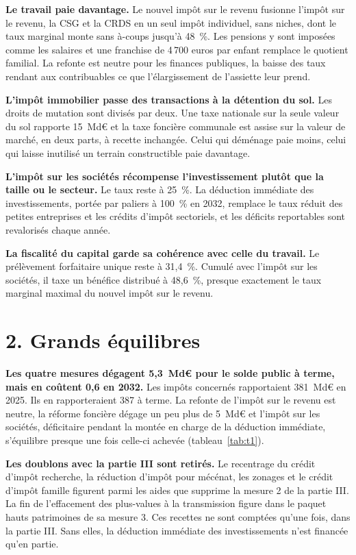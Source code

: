 \documentclass[10pt,a4paper]{article}
\begin{document}
\textbf{Le travail paie davantage.} Le nouvel impôt sur le revenu fusionne l'impôt sur le revenu, la CSG et la CRDS en un
seul impôt individuel, sans niches, dont le taux marginal monte sans à-coups jusqu'à 48~\%. Les pensions y sont imposées
comme les salaires et une franchise de 4\,700 euros par enfant remplace le quotient familial. La refonte est neutre pour
les finances publiques, la baisse des taux rendant aux contribuables ce que l'élargissement de l'assiette leur prend.

\textbf{L'impôt immobilier passe des transactions à la détention du sol.} Les droits de mutation sont divisés par deux.
Une taxe nationale sur la seule valeur du sol rapporte 15~Md€ et la taxe foncière communale est assise sur la valeur de
marché, en deux parts, à recette inchangée. Celui qui déménage paie moins, celui qui laisse inutilisé un terrain
constructible paie davantage.

\textbf{L'impôt sur les sociétés récompense l'investissement plutôt que la taille ou le secteur.} Le taux reste à 25~\%.
La déduction immédiate des investissements, portée par paliers à 100~\% en 2032, remplace le taux réduit des petites
entreprises et les crédits d'impôt sectoriels, et les déficits reportables sont revalorisés chaque année.

\textbf{La fiscalité du capital garde sa cohérence avec celle du travail.} Le prélèvement forfaitaire unique reste à
31,4~\%. Cumulé avec l'impôt sur les sociétés, il taxe un bénéfice distribué à 48,6~\%, presque exactement le taux
marginal maximal du nouvel impôt sur le revenu.

\section{2. Grands équilibres}

\textbf{Les quatre mesures dégagent 5,3~Md€ pour le solde public à terme, mais en coûtent 0,6 en 2032.} Les impôts
concernés rapportaient 381~Md€ en 2025. Ils en rapporteraient 387 à terme. La refonte de l'impôt sur le revenu est
neutre, la réforme foncière dégage un peu plus de 5~Md€ et l'impôt sur les sociétés, déficitaire pendant la montée en
charge de la déduction immédiate, s'équilibre presque une fois celle-ci achevée (tableau~\ref{tab:t1}).



\textbf{Les doublons avec la partie III sont retirés.} Le recentrage du crédit d'impôt recherche, la réduction d'impôt
pour mécénat, les zonages et le crédit d'impôt famille figurent parmi les aides que supprime la mesure 2 de la partie III.
La fin de l'effacement des plus-values à la transmission figure dans le paquet hauts patrimoines de sa mesure 3. Ces
recettes ne sont comptées qu'une fois, dans la partie III. Sans elles, la déduction immédiate des investissements n'est
financée qu'en partie.
\end{document}
